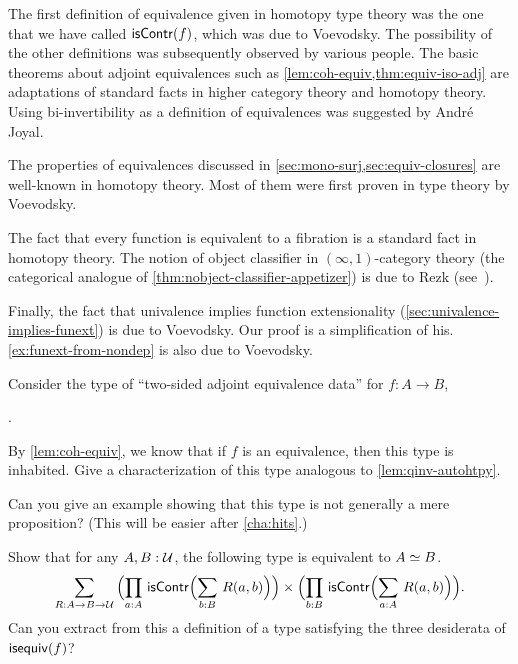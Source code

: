 The first definition of equivalence given in homotopy type theory was the one that we have called $\mathsf{isContr}(f)$, which was due to Voevodsky.
The possibility of the other definitions was subsequently observed by various people.
The basic theorems about adjoint equivalences such as \cref{lem:coh-equiv,thm:equiv-iso-adj} are adaptations of standard facts in higher category theory and homotopy theory.
Using bi-invertibility as a definition of equivalences was suggested by Andr\'e Joyal.

The properties of equivalences discussed in \cref{sec:mono-surj,sec:equiv-closures} are well-known in homotopy theory.
Most of them were first proven in type theory by Voevodsky.

The fact that every function is equivalent to a fibration is a standard fact in homotopy theory.
The notion of object classifier
%
%
in $(\infty,1)$-category
%
theory (the categorical analogue of \cref{thm:nobject-classifier-appetizer}) is due to Rezk (see~\cite{Rezk05,lurie:higher-topoi}).

Finally, the fact that univalence implies function extensionality (\cref{sec:univalence-implies-funext}) is due to Voevodsky.
Our proof is a simplification of his.
\cref{ex:funext-from-nondep} is also due to Voevodsky.

\sectionExercises

\begin{ex}\label{ex:two-sided-adjoint-equivalences}
  Consider the type of ``two-sided adjoint equivalence data'' for $f:A\to B$,
  \begin{narrowmultline*}
    \narrowbreak
     \times
    .
  \end{narrowmultline*}
  By \cref{lem:coh-equiv}, we know that if $f$ is an equivalence, then this type is inhabited.
  Give a characterization of this type analogous to \cref{lem:qinv-autohtpy}.

  Can you give an example showing that this type is not generally a mere proposition?
  (This will be easier after \cref{cha:hits}.)
\end{ex}

\begin{ex}\label{ex:symmetric-equiv}
  Show that for any $A,B:\mathcal{U}$, the following type is equivalent to $A \simeq B$.
  \begin{equation*}
    \sm{R:A\to B\to \type}
    \Parens{\prd{a:A} \iscontr\Parens{\sm{b:B} R(a,b)}} \times
    \Parens{\prd{b:B} \iscontr\Parens{\sm{a:A} R(a,b)}}.
  \end{equation*}
  Can you extract from this a definition of a type satisfying the three desiderata of $\mathsf{isequiv}(f)$?
\end{ex}

